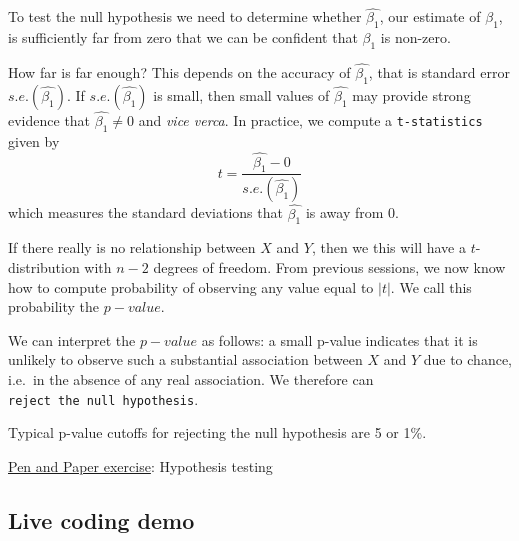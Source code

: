 \documentclass[]{article}
\begin{document}
To test the null hypothesis we need to determine whether
\(\hat{\beta_1}\), our estimate of \(\beta_1\), is sufficiently far from
zero that we can be confident that \(\beta_1\) is non-zero.

How far is far enough? This depends on the accuracy of
\(\hat{\beta_1}\), that is standard error \(s.e.(\hat{\beta_1})\). If
\(s.e.(\hat{\beta_1})\) is small, then small values of \(\hat{\beta_1}\)
may provide strong evidence that \(\hat{\beta_1}\neq0\) and \emph{vice
verca}. In practice, we compute a \texttt{t-statistics} given by
\[t=\frac{\hat{\beta_1}-0}{s.e.(\hat{\beta_1})}\] which measures the
standard deviations that \(\hat{\beta_1}\) is away from 0.

If there really is no relationship between \(X\) and \(Y\), then we this
will have a \(t\)-distribution with \(n-2\) degrees of freedom. From
previous sessions, we now know how to compute probability of observing
any value equal to \(|t|\). We call this probability the \(p-value\).

We can interpret the \(p-value\) as follows: a small p-value indicates
that it is unlikely to observe such a substantial association between
\(X\) and \(Y\) due to chance, i.e.~in the absence of any real
association. We therefore can \texttt{reject\ the\ null\ hypothesis}.

Typical p-value cutoffs for rejecting the null hypothesis are 5 or 1\%.

\href{pen-and-paper-plasma-volume.pdf}{Pen and Paper exercise}:
Hypothesis testing

\hypertarget{live-coding-demo}{%
\subsection{Live coding demo}\label{live-coding-demo}}
\end{document}
